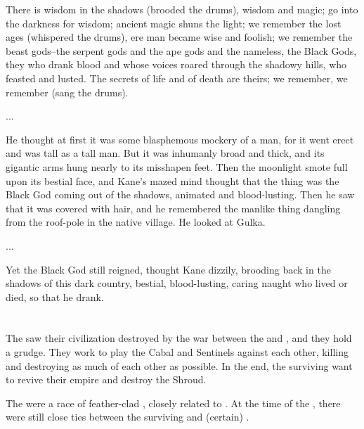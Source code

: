 {  There is wisdom in the shadows (brooded the drums), wisdom and magic; go into the darkness for wisdom; ancient magic shuns the light; we remember the lost ages (whispered the drums), ere man became wise and foolish; we remember the beast gods--the serpent gods and the ape gods and the nameless, the Black Gods, they who drank blood and whose voices roared through the shadowy hills, who feasted and lusted. The secrets of life and of death are theirs; we remember, we remember (sang the drums).

  ...

  He thought at first it was some blasphemous mockery of a man, for it went erect and was tall as a tall man. But it was inhumanly broad and thick, and its gigantic arms hung nearly to its misshapen feet. Then the moonlight smote full upon its bestial face, and Kane's mazed mind thought that the thing was the Black God coming out of the shadows, animated and blood-lusting. Then he saw that it was covered with hair, and he remembered the manlike thing dangling from the roof-pole in the native village. He looked at Gulka.

  ...

  Yet the Black God still reigned, thought Kane dizzily, brooding back in the shadows of this dark country, bestial, blood-lusting, caring naught who lived or died, so that he drank.
}















\section{\Cuezcans}
\index{\Cuezca}
The \cuezcans{} saw their civilization destroyed by the war between the \dragons{} and \banes{}, and they hold a grudge. 
They work to play the Cabal and Sentinels against each other, killing and destroying as much of each other as possible. 
In the end, the surviving \cuezcans{} want to revive their empire and destroy the Shroud. 

The \cuezcans{} were a race of feather-clad \saurians{}, closely related to \nycans. 
At the time of the \thirdbanewar, there were still close ties between the surviving \cuezcans{} and (certain) \nycans. 

